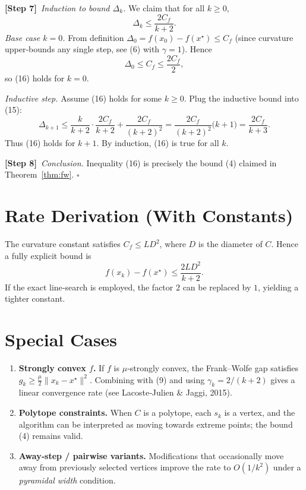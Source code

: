 \documentclass{article}
\begin{document}
\noindent\textbf{[Step 7]}~\emph{Induction to bound $\Delta_k$.}  
We claim that for all $k\ge 0$,
\[
\Delta_k \le \frac{2C_f}{k+2}. \tag{16}
\]
\emph{Base case $k=0$.}  
From definition $\Delta_0 = f(x_0)-f(x^\star)\le C_f$ (since curvature upper‑bounds any single step, see (6) with $\gamma=1$). Hence
\[
\Delta_0 \le C_f \le \frac{2C_f}{2},
\]
so (16) holds for $k=0$.

\emph{Inductive step.} Assume (16) holds for some $k\ge0$. Plug the inductive bound into (15):
\[
\Delta_{k+1}
\le \frac{k}{k+2}\cdot\frac{2C_f}{k+2}+\frac{2C_f}{(k+2)^{2}}
= \frac{2C_f}{(k+2)^{2}}\bigl(k+1\bigr)
= \frac{2C_f}{k+3}.
\tag{17}
\]
Thus (16) holds for $k+1$. By induction, (16) is true for all $k$.

\noindent\textbf{[Step 8]}~\emph{Conclusion.}  
Inequality (16) is precisely the bound (4) claimed in Theorem~\ref{thm:fw}. $\square$

\section*{Rate Derivation (With Constants)}
The curvature constant satisfies $C_f\le LD^{2}$, where $D$ is the diameter of $C$. Hence a fully explicit bound is
\[
f(x_k)-f(x^\star) \le \frac{2L D^{2}}{k+2}. \tag{18}
\]
If the exact line‑search is employed, the factor $2$ can be replaced by $1$, yielding a tighter constant.

\section*{Special Cases}
\begin{enumerate}[label=\arabic*.]
\item \textbf{Strongly convex $f$.} If $f$ is $\mu$‑strongly convex, the Frank–Wolfe gap satisfies $g_k\ge \frac{\mu}{2}\|x_k-x^\star\|^{2}$. Combining with (9) and using $\gamma_k=2/(k+2)$ gives a linear convergence rate (see Lacoste‑Julien \& Jaggi, 2015).
\item \textbf{Polytope constraints.} When $C$ is a polytope, each $s_k$ is a vertex, and the algorithm can be interpreted as moving towards extreme points; the bound (4) remains valid.
\item \textbf{Away‑step / pairwise variants.} Modifications that occasionally move away from previously selected vertices improve the rate to $O(1/k^{2})$ under a \emph{pyramidal width} condition.
\end{enumerate}
\end{document}
